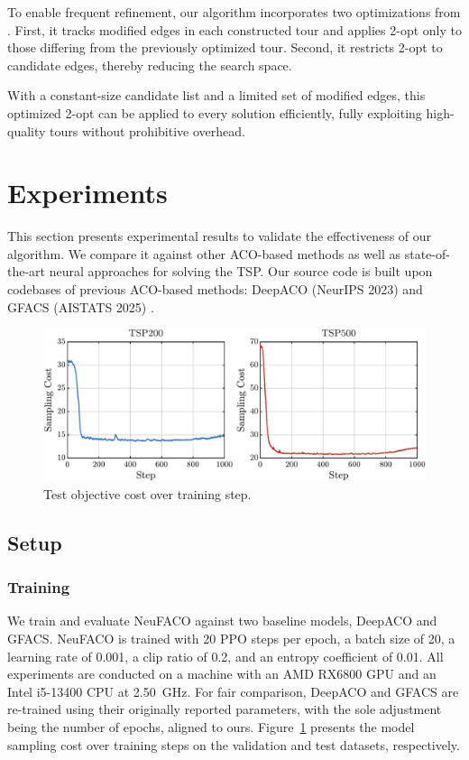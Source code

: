\documentclass[a4paper,conference]{IEEEtran}
\begin{document}
To enable frequent refinement, our algorithm incorporates two optimizations from \cite{FACO2023}. First, it tracks modified edges in each constructed tour and applies 2-opt only to those differing from the previously optimized tour. Second, it restricts 2-opt to candidate edges, thereby reducing the search space.

With a constant-size candidate list and a limited set of modified edges, this optimized 2-opt can be applied to every solution efficiently, fully exploiting high-quality tours without prohibitive overhead.

\section{Experiments}
\hypersetup{citecolor=blue}
This section presents experimental results to validate the effectiveness of our algorithm. We compare it against other ACO-based methods as well as state-of-the-art neural approaches for solving the TSP. Our source code is built upon codebases of previous ACO-based methods: DeepACO (NeurIPS 2023) \cite{DeepACO} and GFACS (AISTATS 2025) \cite{GFACS}.

\begin{figure}[H]
  \centering
  \includegraphics[width=\linewidth]{TSP200_TSP500_Test.pdf}
  \caption{Test objective cost over training step.}
  \label{fig:val}
\end{figure}

\subsection{Setup}

\subsubsection{Training}
We train and evaluate NeuFACO against two baseline models, DeepACO and GFACS. NeuFACO is trained with 20 PPO steps per epoch, a batch size of 20, a learning rate of 0.001, a clip ratio of 0.2, and an entropy coefficient of 0.01. All experiments are conducted on a machine with an AMD RX6800 GPU and an Intel i5-13400 CPU at \SI{2.50}{GHz}. For fair comparison, DeepACO and GFACS are re-trained using their originally reported parameters, with the sole adjustment being the number of epochs, aligned to ours. Figure~\ref{fig:val} presents the model sampling cost over training steps on the validation and test datasets, respectively.
\end{document}
